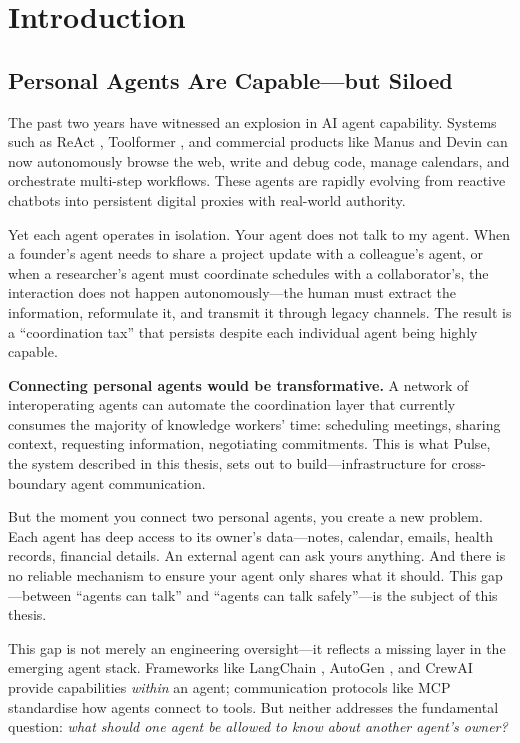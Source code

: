 \chapter{Introduction}
\label{chapter:introduction}

\section{Personal Agents Are Capable---but Siloed}

The past two years have witnessed an explosion in AI agent capability. Systems such as ReAct \cite{yao2023react}, Toolformer \cite{schick2023toolformer}, and commercial products like Manus \cite{manus2025} and Devin \cite{devin2024} can now autonomously browse the web, write and debug code, manage calendars, and orchestrate multi-step workflows. These agents are rapidly evolving from reactive chatbots into persistent digital proxies with real-world authority.

Yet each agent operates in isolation. Your agent does not talk to my agent. When a founder's agent needs to share a project update with a colleague's agent, or when a researcher's agent must coordinate schedules with a collaborator's, the interaction does not happen autonomously---the human must extract the information, reformulate it, and transmit it through legacy channels. The result is a ``coordination tax'' that persists despite each individual agent being highly capable.

\textbf{Connecting personal agents would be transformative.} A network of interoperating agents can automate the coordination layer that currently consumes the majority of knowledge workers' time: scheduling meetings, sharing context, requesting information, negotiating commitments. This is what Pulse, the system described in this thesis, sets out to build---infrastructure for cross-boundary agent communication.

But the moment you connect two personal agents, you create a new problem. Each agent has deep access to its owner's data---notes, calendar, emails, health records, financial details. An external agent can ask yours anything. And there is no reliable mechanism to ensure your agent only shares what it should. This gap---between ``agents can talk'' and ``agents can talk safely''---is the subject of this thesis.

This gap is not merely an engineering oversight---it reflects a missing layer in the emerging agent stack. Frameworks like LangChain \cite{langchain2023}, AutoGen \cite{wu2023autogen}, and CrewAI provide capabilities \textit{within} an agent; communication protocols like MCP \cite{anthropic2024mcp} standardise how agents connect to tools. But neither addresses the fundamental question: \textit{what should one agent be allowed to know about another agent's owner?}

